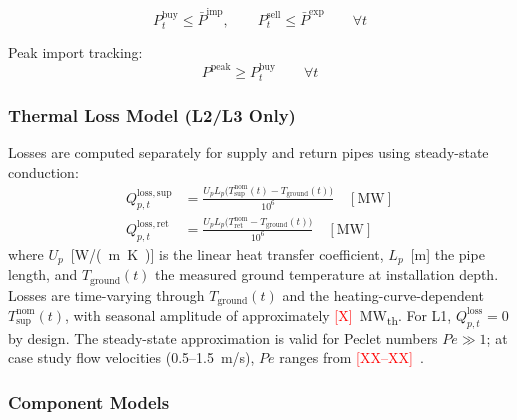 \documentclass[review,3p]{elsarticle}
\newcommand{\placeholder}[1]{\textcolor{red}{[#1]}}
\begin{document}
\begin{equation}
P_t^{\mathrm{buy}} \leq \bar{P}^{\mathrm{imp}}, \qquad
P_t^{\mathrm{sell}} \leq \bar{P}^{\mathrm{exp}}
\qquad \forall t
\label{eq:grid_cap}
\end{equation}

Peak import tracking:
\begin{equation}
P^{\mathrm{peak}} \geq P_t^{\mathrm{buy}} \qquad \forall t
\label{eq:peak}
\end{equation}

\subsubsection{Thermal Loss Model (L2/L3 Only)}
\label{sec:model_losses}

Losses are computed separately for supply and return pipes using
steady-state conduction:
\begin{align}
Q_{p,t}^{\mathrm{loss,sup}} &= \frac{U_p L_p \big(
T_{\mathrm{sup}}^{\mathrm{nom}}(t) - T_{\mathrm{ground}}(t)\big)}{10^6}
\quad [\mathrm{MW}]
\label{eq:loss_supply} \\
Q_{p,t}^{\mathrm{loss,ret}} &= \frac{U_p L_p \big(
T_{\mathrm{ret}}^{\mathrm{nom}} - T_{\mathrm{ground}}(t)\big)}{10^6}
\quad [\mathrm{MW}]
\label{eq:loss_return}
\end{align}
where $U_p$~[\si{W/(m.K)}] is the linear heat transfer coefficient,
$L_p$~[m] the pipe length, and $T_{\mathrm{ground}}(t)$ the measured
ground temperature at installation depth. Losses are time-varying
through $T_{\mathrm{ground}}(t)$ and the heating-curve-dependent
$T_{\mathrm{sup}}^{\mathrm{nom}}(t)$, with seasonal amplitude of
approximately \placeholder{X}~MW\textsubscript{th}. For L1,
$Q_{p,t}^{\mathrm{loss}} = 0$ by design. The steady-state
approximation is valid for Peclet numbers $Pe \gg 1$; at case study
flow velocities (0.5--1.5~m/s), $Pe$ ranges from
\placeholder{XX--XX}~\cite{vanderHeijde2017}.

\subsubsection{Component Models}
\label{sec:model_components}
\end{document}
